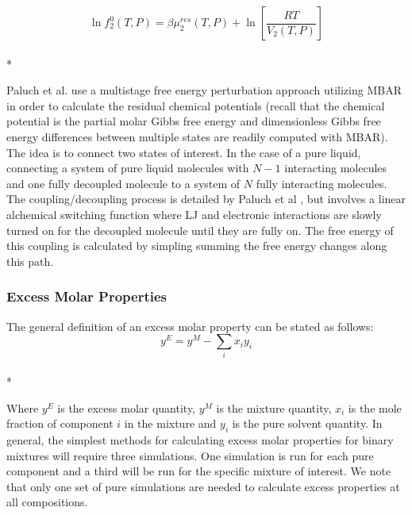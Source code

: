 \documentclass[aps,pre,twocolumn,nofootinbib,superscriptaddress,linenumbers,10pt, draft,tightenlines]{revtex4-1}
\begin{document}
\begin{equation}\ln f_2^0\left(T,P\right) = \beta\mu_2^{res}\left(T,P\right) + \ln\left[\frac{R T}{V_2\left(T,P\right)}\right]\end{equation}\\*

Paluch et al. use a multistage free energy perturbation approach utilizing MBAR in order to calculate the residual chemical potentials (recall that the chemical potential is the partial molar Gibbs free energy and dimensionless Gibbs free energy differences between multiple states are readily computed with MBAR). The idea is to connect two states of interest. In the case of a pure liquid, connecting a system of pure liquid molecules with $N - 1$ interacting molecules and one fully decoupled molecule to a system of $N$ fully interacting molecules. The coupling/decoupling process is detailed by Paluch et al \cite{paluch0}, but involves a linear alchemical switching function where LJ and electronic interactions are slowly turned on for the decoupled molecule until they are fully on. The free energy of this coupling is calculated by simpling summing the free energy changes along this path.     


\subsubsection{Excess Molar Properties}
The general definition of an excess molar property can be stated as follows:
\begin{equation}y^{E} = y^{M} - \sum_{i} x_i y_i\end{equation}\\*

Where $y^E$ is the excess molar quantity, $y^M$ is the mixture quantity, $x_i$ is the mole fraction of component $i$ in the mixture and $y_i$ is the pure solvent quantity. In general, the simplest methods for calculating excess molar properties for binary mixtures will require three simulations. One simulation is run for each pure component and a third will be run for the specific mixture of interest.
We note that only one set of pure simulations are needed to calculate excess properties at all compositions.

\end{document}
